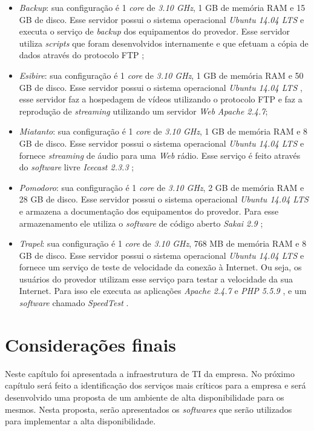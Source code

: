 \begin{itemize}
 \item \textit{Backup}: sua configuração é 1 \textit{core} de \textit{3.10 GHz}, 1 GB de memória \ac{RAM} e 15 GB de disco. 
 Esse servidor possui o sistema operacional \textit{Ubuntu 14.04 \ac{LTS}} \cite{ubuntu} e executa o serviço de \textit{backup} dos equipamentos 
 do provedor. Esse servidor utiliza \textit{scripts} que foram desenvolvidos internamente e que efetuam a cópia de dados através do protocolo 
 \ac{FTP} \cite{kurose2006};
 
 \item \textit{Esibire}: sua configuração é 1 \textit{core} de \textit{3.10 GHz}, 1 GB de memória \ac{RAM} e 50 GB de disco. 
 Esse servidor possui o sistema operacional \textit{Ubuntu 14.04 \ac{LTS}} \cite{ubuntu}, esse servidor faz a hospedagem de vídeos utilizando o 
 protocolo \ac{FTP} e faz a reprodução de \textit{streaming} utilizando um servidor \textit{Web} \textit{Apache 2.4.7};
 
 \item \textit{Miatanto}: sua configuração é 1 \textit{core} de \textit{3.10 GHz}, 1 GB de memória \ac{RAM} e 8 GB de disco. 
 Esse servidor possui o sistema operacional \textit{Ubuntu 14.04 \ac{LTS}} \cite{ubuntu} e fornece \textit{streaming} de áudio para uma \textit{Web} 
 rádio. Esse serviço é feito através do \textit{software} livre \textit{Icecast 2.3.3} \cite{icecast};
 
 \item \textit{Pomodoro}: sua configuração é 1 \textit{core} de \textit{3.10 GHz}, 2 GB de memória \ac{RAM} e 28 GB de disco. 
 Esse servidor possui o sistema operacional \textit{Ubuntu 14.04 \ac{LTS}} \cite{ubuntu} e armazena a documentação dos equipamentos do provedor. 
 Para esse armazenamento ele utiliza o \textit{software} de código aberto \textit{Sakai 2.9} \cite{sakai};
 
 \item \textit{Trapel}: sua configuração é 1 \textit{core} de \textit{3.10 GHz}, 768 MB de memória \ac{RAM} e 8 GB de disco. 
 Esse servidor possui o sistema operacional \textit{Ubuntu 14.04 \ac{LTS}} \cite{ubuntu} e fornece um serviço de teste de velocidade da conexão 
 à Internet. Ou seja, os usuários do provedor utilizam esse serviço para testar a velocidade da sua Internet. Para isso ele executa as aplicações 
 \textit{Apache 2.4.7} \cite{apache} e \textit{\ac{PHP} 5.5.9} \cite{php}, e um \textit{software} chamado \textit{SpeedTest} \cite{speedtest}.
\end{itemize}

\section{Considerações finais}

Neste capítulo foi apresentada a infraestrutura de \ac{TI} da empresa. No próximo capítulo será feito a identificação dos serviços mais 
críticos para a empresa e será desenvolvido uma proposta de um ambiente de alta disponibilidade para os mesmos. Nesta proposta, serão apresentados 
os \textit{softwares} que serão utilizados para implementar a alta disponibilidade.
